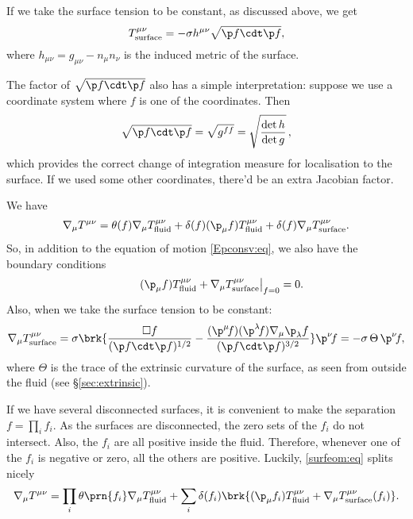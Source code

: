 If we take the surface tension to be constant, as discussed above, we get
%
\begin{equation}\label{surfstress:eq}
  T^{\mu\nu}_\text{surface} = -\sigma h^{\mu\nu} \sqrt{\p f \cdt \p f},
\end{equation}
%
where $h_{\mu\nu} = g_{\mu\nu} - n_\mu n_\nu$ is the induced metric of the surface.

The factor of $\sqrt{\p f \cdt \p f}$ also has a simple interpretation: suppose we use a coordinate system where $f$ is one of the coordinates. Then
%
\begin{equation}\label{surfmeasure:eq}
  \sqrt{\p f \cdt \p f} = \sqrt{g^{ff}} = \sqrt{\frac{\det h}{\det g}}\,,
\end{equation}
%
which provides the correct change of integration measure for localisation to the surface. If we used some other coordinates, there'd be an extra Jacobian factor.

We have
%
\begin{equation}\label{surfeom:eq}
  \nabla_\mu T^{\mu\nu} = \theta(f)\nabla_\mu T^{\mu\nu}_\text{fluid} + \delta(f)(\p_\mu f) T^{\mu\nu}_\text{fluid} + \delta(f)\nabla_\mu T^{\mu\nu}_\text{surface}.
\end{equation}
%
So, in addition to the equation of motion \eqref{Epconsv:eq}, we also have the boundary conditions
%
\begin{equation}\label{surfbc:eq}
  \left.\phantom{\half}(\p_\mu f) T^{\mu\nu}_\text{fluid} + \nabla_\mu T^{\mu\nu}_\text{surface}\right\vert_{f=0}=0.
\end{equation}
%
Also, when we take the surface tension to be constant:
%
\begin{equation}\label{extcurvsurf:eq}
  \nabla_\mu T^{\mu\nu}_\text{surface} = \sigma \brk{\frac{\square f}{(\p f \cdt \p f)^{1/2}} - \frac{(\p^\mu\! f) (\p^\lambda\! f)\nabla_\mu\p_\lambda f }{(\p f \cdt \p f)^{3/2}}} \p^\nu\! f = -\sigma \,\Theta \, \p^\nu\! f,
\end{equation}
%
where $\Theta$ is the trace of the extrinsic curvature of the surface, as seen from outside the fluid (see \S\ref{sec:extrinsic}).

If we have several disconnected surfaces, it is convenient to make the separation $f=\prod_i f_i$. As the surfaces are disconnected, the zero sets of the $f_i$ do not intersect. Also, the $f_i$ are all positive inside the fluid. Therefore, whenever one of the $f_i$ is negative or zero, all the others are positive. Luckily, \eqref{surfeom:eq} splits nicely
%
\begin{equation*}
  \nabla_\mu T^{\mu\nu} = \prod_i \theta\prn{f_i}\nabla_\mu T^{\mu\nu}_\text{fluid} + \sum_i \delta(f_i)\brk{(\p_\mu f_i) T^{\mu\nu}_\text{fluid} + \nabla_\mu T^{\mu\nu}_\text{surface}(f_i)}.
\end{equation*}
%


